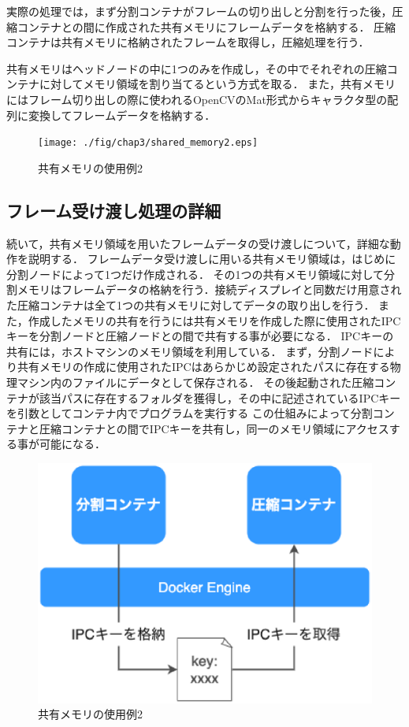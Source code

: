 実際の処理では，まず分割コンテナがフレームの切り出しと分割を行った後，圧縮コンテナとの間に作成された共有メモリにフレームデータを格納する．
圧縮コンテナは共有メモリに格納されたフレームを取得し，圧縮処理を行う．

共有メモリはヘッドノードの中に1つのみを作成し，その中でそれぞれの圧縮コンテナに対してメモリ領域を割り当てるという方式を取る．
また，共有メモリにはフレーム切り出しの際に使われるOpenCVのMat形式からキャラクタ型の配列に変換してフレームデータを格納する．

\begin{figure}[H]
    \hspace*{\fill}
    \texttt{[image: ./fig/chap3/shared\_memory2.eps]}
    \hspace*{\fill}
    \caption{共有メモリの使用例2}
\end{figure}

\subsection*{フレーム受け渡し処理の詳細}

続いて，共有メモリ領域を用いたフレームデータの受け渡しについて，詳細な動作を説明する．
フレームデータ受け渡しに用いる共有メモリ領域は，はじめに分割ノードによって1つだけ作成される．
その1つの共有メモリ領域に対して分割メモリはフレームデータの格納を行う．接続ディスプレイと同数だけ用意された圧縮コンテナは全て1つの共有メモリに対してデータの取り出しを行う．
また，作成したメモリの共有を行うには共有メモリを作成した際に使用されたIPCキーを分割ノードと圧縮ノードとの間で共有する事が必要になる．
IPCキーの共有には，ホストマシンのメモリ領域を利用している．
まず，分割ノードにより共有メモリの作成に使用されたIPCはあらかじめ設定されたパスに存在する物理マシン内のファイルにデータとして保存される．
その後起動された圧縮コンテナが該当パスに存在するフォルダを獲得し，その中に記述されているIPCキーを引数としてコンテナ内でプログラムを実行する
この仕組みによって分割コンテナと圧縮コンテナとの間でIPCキーを共有し，同一のメモリ領域にアクセスする事が可能になる．

\begin{figure}[H]
    \hspace*{\fill}
    \includegraphics[width=\linewidth]{./fig/chap3/ipckeyshare.eps}
    \hspace*{\fill}
    \caption{共有メモリの使用例2}
\end{figure}

